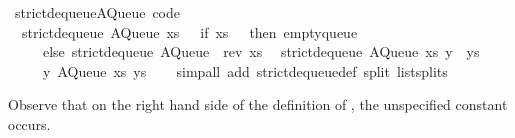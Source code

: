 \begin{isabellebody}
\isanewline
{}\isamarkupfalse%
\ strict{}dequeue{}{}AQueue\ {}code{}{}\isanewline
\ \ {}strict{}dequeue{}\ {}AQueue\ xs\ {}{}{}\ {}\ {}if\ xs\ {}\ {}{}\ then\ empty{}queue\isanewline
\ \ \ \ \ else\ strict{}dequeue{}\ {}AQueue\ {}{}\ {}rev\ xs{}{}{}{}\isanewline
\ \ {}strict{}dequeue{}\ {}AQueue\ xs\ {}y\ {}\ ys{}{}\ {}\isanewline
\ \ \ \ \ {}y{}\ AQueue\ xs\ ys{}{}\isanewline
\ \ \isamarkupfalse%
\ {}simp{}all\ add{}\ strict{}dequeue{}{}def\ split{}\ list{}splits{}%
\endisatagquote
{\isafoldquote}%
%
\isadelimquote
%
\endisadelimquote
%
\begin{isamarkuptext}%
Observe that on the right hand side of the definition of , the unspecified constant  occurs.


\end{isamarkuptext}
\end{isabellebody}
